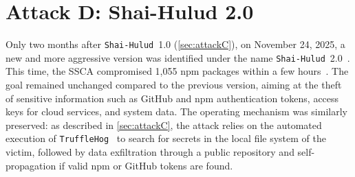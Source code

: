 \section{Attack D: Shai-Hulud 2.0}
\label{sec:attackD}

Only two months after \texttt{Shai-Hulud}~1.0 (\cref{sec:attackC}),
on November 24, 2025, a new and more aggressive version was identified under the name \texttt{Shai-Hulud}~2.0~\cite{cutolo2025shaihulud20}.
This time, the \ac{SSCA} compromised 1,055 \ac{npm} packages within a few hours~\cite{cutolo2025shaihulud20}.
The goal remained unchanged compared to the previous version, 
aiming at the theft of sensitive information such as GitHub and \ac{npm} authentication tokens,
access keys for cloud services, and system data.
The operating mechanism was similarly preserved: as described in \cref{sec:attackC},
the attack relies on the automated execution of \texttt{TruffleHog}~\cite{trufflehog} to search for secrets in the local file system of the victim,
followed by data exfiltration through a public repository and self-propagation if valid \ac{npm} or GitHub tokens are found.

